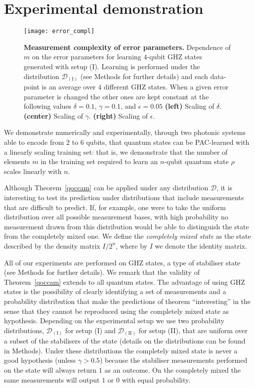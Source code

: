 \documentclass[aps,superscriptaddress,nofootinbib,twocolumn]{revtex4-1}
\begin{document}
\section*{Experimental demonstration}\label{sec:expdem}


\begin{figure*}
\texttt{[image: error\_compl]}

\caption{\textbf{Measurement complexity of error parameters.} Dependence of $m$
on the error parameters for learning $4$-qubit GHZ states generated with setup (I). Learning is performed under the distribution $\mathcal{D}_{(\mathrm{I})}$ (see Methods for further details) and each data-point is an average over $4$ different GHZ states. When a given error parameter is changed the
other ones are kept constant at the following values $\delta = 0.1$, $\gamma = 0.1$, and
$\epsilon = 0.05$ \textbf{(left)} Scaling of $\delta$. \textbf{(center)} Scaling
of $\gamma$. \textbf{(right)} Scaling of $\epsilon$.}

\label{fig:errorcompl}
\end{figure*}


 We demonstrate numerically and experimentally, through two photonic systems able to encode from $2$ to $6$ qubits, that quantum states can be PAC-learned with a linearly scaling training set:
that is, we demonstrate that the number of elements $m$ in the training set required
to learn an $n$-qubit quantum state $\rho$ scales linearly with $n$. 


Although Theorem~\ref{qoccam} can be applied under any distribution
$\mathcal{D}$, it is interesting to test its prediction under distributions that
include measurements that are difficult to predict. If, for example, one were to
take the uniform distribution over all possible measurement bases, with high
probability no measurement drawn from this distribution would be able to
distinguish the state from the completely mixed one. We define the
\textit{completely mixed state} as the state described by the density matrix
$I / 2^{n}$, where by $I$ we denote the identity matrix.

All of our experiments are performed on GHZ states, a type of stabiliser state (see Methods for further details). We remark that the validity of Theorem~\ref{qoccam} extends to all quantum states. The advantage of using GHZ states is the possibility of clearly identifying a set of measurements and a probability distribution that make the predictions of theorem ``interesting'' in the sense that they cannot be reproduced using the completely mixed state as hypothesis. Depending on the experimental setup we use two probability distributions, $\mathcal{D}_{(\mathrm{I})}$ for setup (I) and $\mathcal{D}_{(\mathrm{II})}$ for setup (II), that are uniform over a subset of the
stabilisers of the state (details on the distributions can be found in Methods). Under these
distributions the completely mixed state is never a good hypothesis (unless $\gamma>0.5$) because the
stabiliser measurements performed on the state will always return $1$ as an outcome. On the completely mixed the same measurements will output $1$ or $0$ with equal probability.
\end{document}
